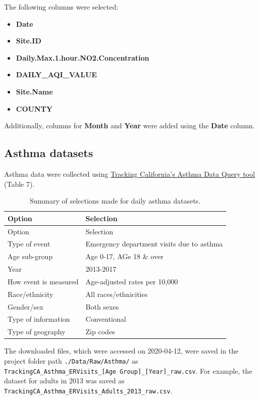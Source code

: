 \documentclass[12pt,]{article}
\providecommand{\tightlist}{%
  \setlength{\itemsep}{0pt}\setlength{\parskip}{0pt}}
\begin{document}
The following columns were selected:

\begin{itemize}
\tightlist
\item
  \textbf{Date}\\
\item
  \textbf{Site.ID}\\
\item
  \textbf{Daily.Max.1.hour.NO2.Concentration}\\
\item
  \textbf{DAILY\_AQI\_VALUE}\\
\item
  \textbf{Site.Name}\\
\item
  \textbf{COUNTY}
\end{itemize}

Additionally, columns for \textbf{Month} and \textbf{Year} were added
using the \textbf{Date} column.

\hypertarget{asthma-datasets}{%
\subsection{Asthma datasets}\label{asthma-datasets}}

Asthma data were collected using
\href{https://trackingcalifornia.org/asthma/query}{Tracking California's
Asthma Data Query tool} (Table 7).

\begin{longtable}[]{@{}ll@{}}
\caption{Summary of selections made for daily asthma
datasets.}\tabularnewline
\toprule
Option & Selection\tabularnewline
\midrule
\endfirsthead
\toprule
Option & Selection\tabularnewline
\midrule
\endhead
Type of event & Emergency department visits due to asthma\tabularnewline
Age sub-group & Age 0-17, AGe 18 \& over\tabularnewline
Year & 2013-2017\tabularnewline
How event is measured & Age-adjusted rates per 10,000\tabularnewline
Race/ethnicity & All races/ethnicities\tabularnewline
Gender/sex & Both sexes\tabularnewline
Type of information & Conventional\tabularnewline
Type of geography & Zip codes\tabularnewline
\bottomrule
\end{longtable}

The downloaded files, which were accessed on 2020-04-12, were saved in
the project folder path \texttt{./Data/Raw/Asthma/} as
\texttt{TrackingCA\_Asthma\_ERVisits\_{[}Age\ Group{]}\_{[}Year{]}\_raw.csv}.
For example, the dataset for adults in 2013 was saved as
\texttt{TrackingCA\_Asthma\_ERVisits\_Adults\_2013\_raw.csv}.
\end{document}
